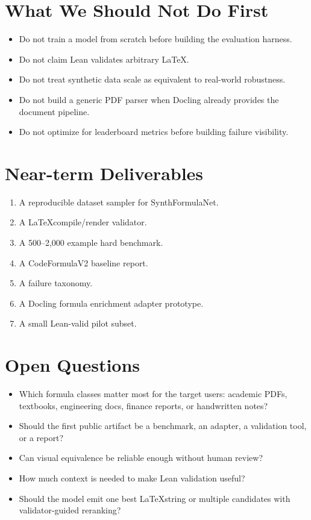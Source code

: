 \documentclass[11pt]{article}
\begin{document}
\section{What We Should Not Do First}

\begin{itemize}[leftmargin=*]
\item Do not train a model from scratch before building the evaluation harness.
\item Do not claim Lean validates arbitrary \LaTeX.
\item Do not treat synthetic data scale as equivalent to real-world robustness.
\item Do not build a generic PDF parser when Docling already provides the document pipeline.
\item Do not optimize for leaderboard metrics before building failure visibility.
\end{itemize}

\section{Near-term Deliverables}

\begin{enumerate}[leftmargin=*]
\item A reproducible dataset sampler for SynthFormulaNet.
\item A \LaTeX compile/render validator.
\item A 500--2,000 example hard benchmark.
\item A CodeFormulaV2 baseline report.
\item A failure taxonomy.
\item A Docling formula enrichment adapter prototype.
\item A small Lean-valid pilot subset.
\end{enumerate}

\section{Open Questions}

\begin{itemize}[leftmargin=*]
\item Which formula classes matter most for the target users: academic PDFs, textbooks, engineering docs, finance reports, or handwritten notes?
\item Should the first public artifact be a benchmark, an adapter, a validation tool, or a report?
\item Can visual equivalence be reliable enough without human review?
\item How much context is needed to make Lean validation useful?
\item Should the model emit one best \LaTeX string or multiple candidates with validator-guided reranking?
\end{itemize}
\end{document}
